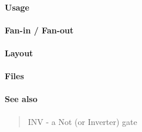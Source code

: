 \paragraph{Usage}

\paragraph{Fan-in / Fan-out}

\paragraph{Layout}

\paragraph{Files}

\paragraph{See also}
\begin{quote}
    INV - a Not (or Inverter) gate
\end{quote}
